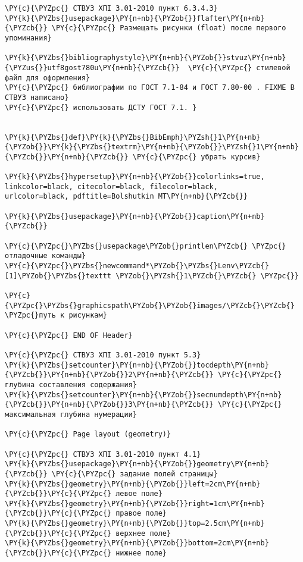 \begin{Verbatim}[commandchars=\\\{\}]
\PY{c}{\PYZpc{} СТВУЗ ХПІ 3.01-2010 пункт 6.3.4.3}
\PY{k}{\PYZbs{}usepackage}\PY{n+nb}{\PYZob{}}flafter\PY{n+nb}{\PYZcb{}} \PY{c}{\PYZpc{} Размещать рисунки (float) после первого упоминания}

\PY{k}{\PYZbs{}bibliographystyle}\PY{n+nb}{\PYZob{}}stvuz\PY{n+nb}{\PYZus{}}utf8gost780u\PY{n+nb}{\PYZcb{}}  \PY{c}{\PYZpc{} стилевой файл для оформления}
\PY{c}{\PYZpc{} библиографии по ГОСТ 7.1-84 и ГОСТ 7.80-00 . FIXME В СТВУЗ написано}
\PY{c}{\PYZpc{} использовать ДСТУ ГОСТ 7.1. }


\PY{k}{\PYZbs{}def}\PY{k}{\PYZbs{}BibEmph}\PYZsh{}1\PY{n+nb}{\PYZob{}}\PY{k}{\PYZbs{}textrm}\PY{n+nb}{\PYZob{}}\PYZsh{}1\PY{n+nb}{\PYZcb{}}\PY{n+nb}{\PYZcb{}} \PY{c}{\PYZpc{} убрать курсив}

\PY{k}{\PYZbs{}hypersetup}\PY{n+nb}{\PYZob{}}colorlinks=true, linkcolor=black, citecolor=black, filecolor=black, 
urlcolor=black, pdftitle=Bolshutkin MT\PY{n+nb}{\PYZcb{}}

\PY{k}{\PYZbs{}usepackage}\PY{n+nb}{\PYZob{}}caption\PY{n+nb}{\PYZcb{}}

\PY{c}{\PYZpc{}\PYZbs{}usepackage\PYZob{}printlen\PYZcb{} \PYZpc{} отладочные команды}
\PY{c}{\PYZpc{}\PYZbs{}newcommand*\PYZob{}\PYZbs{}Lenv\PYZcb{}[1]\PYZob{}\PYZbs{}texttt \PYZob{}\PYZsh{}1\PYZcb{}\PYZcb{} \PYZpc{}}

\PY{c}{\PYZpc{}\PYZbs{}graphicspath\PYZob{}\PYZob{}images/\PYZcb{}\PYZcb{} \PYZpc{}путь к рисункам}

\PY{c}{\PYZpc{} END OF Header}

\PY{c}{\PYZpc{} СТВУЗ ХПІ 3.01-2010 пункт 5.3}
\PY{k}{\PYZbs{}setcounter}\PY{n+nb}{\PYZob{}}tocdepth\PY{n+nb}{\PYZcb{}}\PY{n+nb}{\PYZob{}}2\PY{n+nb}{\PYZcb{}} \PY{c}{\PYZpc{} глубина составления содержания}
\PY{k}{\PYZbs{}setcounter}\PY{n+nb}{\PYZob{}}secnumdepth\PY{n+nb}{\PYZcb{}}\PY{n+nb}{\PYZob{}}3\PY{n+nb}{\PYZcb{}} \PY{c}{\PYZpc{} максимальная глубина нумерации}

\PY{c}{\PYZpc{} Page layout (geometry)}

\PY{c}{\PYZpc{} СТВУЗ ХПІ 3.01-2010 пункт 4.1}
\PY{k}{\PYZbs{}usepackage}\PY{n+nb}{\PYZob{}}geometry\PY{n+nb}{\PYZcb{}} \PY{c}{\PYZpc{} задание полей страницы}
\PY{k}{\PYZbs{}geometry}\PY{n+nb}{\PYZob{}}left=2cm\PY{n+nb}{\PYZcb{}}\PY{c}{\PYZpc{} левое поле}
\PY{k}{\PYZbs{}geometry}\PY{n+nb}{\PYZob{}}right=1cm\PY{n+nb}{\PYZcb{}}\PY{c}{\PYZpc{} правое поле}
\PY{k}{\PYZbs{}geometry}\PY{n+nb}{\PYZob{}}top=2.5cm\PY{n+nb}{\PYZcb{}}\PY{c}{\PYZpc{} верхнее поле}
\PY{k}{\PYZbs{}geometry}\PY{n+nb}{\PYZob{}}bottom=2cm\PY{n+nb}{\PYZcb{}}\PY{c}{\PYZpc{} нижнее поле}


\end{Verbatim}
